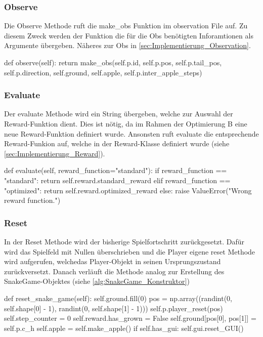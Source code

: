 \subsubsection{Observe} \label{sec:Implementierung-Observe}
Die Observe Methode ruft die make\_obs Funktion im observation File auf. Zu diesem Zweck werden der Funktion die für die Obs benötigten Inforamtionen als Argumente übergeben. Näheres zur Obs in \ref{sec:Implementierung_Observation}.
\begin{python}
    def observe(self):
			return make_obs(self.p.id, self.p.pos, self.p.tail_pos, self.p.direction, self.ground, self.apple, self.p.inter_apple_steps)
\end{python}

\subsubsection{Evaluate} \label{sec:Implementierung-Evaluate}
Der evaluate Methode wird ein String übergeben, welche zur Auswahl der Reward-Funktion dient. Dies ist nötig, da im Rahmen der Optimierung B eine neue Reward-Funktion definiert wurde. Ansonsten ruft evaluate die entsprechende Reward-Funkion auf, welche in der Reward-Klasse definiert wurde (siehe \ref{sec:Implementierung_Reward}).
\begin{python}
	def evaluate(self, reward_function="standard"):
		if reward_function == "standard":
			return self.reward.standard_reward
		elif reward_function == "optimized":
			return self.reward.optimized_reward
		else:
			raise ValueError("Wrong reward function.")
\end{python}

\subsubsection{Reset} \label{sec:Implementierung-Reset}
In der Reset Methode wird der bisherige Spielfortschritt zurückgesetzt. Dafür wird das Spielfeld mit Nullen überschrieben und die Player eigene reset Methode wird aufgerufen, welchedas Player-Objekt in seinen Ursprungszustand zurückversetzt. Danach verläuft die Methode analog zur Erstellung des SnakeGame-Objektes (siehe \ref{alg:SnakeGame_Konstruktor})
\begin{python}
	def reset_snake_game(self):
		self.ground.fill(0)
		pos = np.array((randint(0, self.shape[0] - 1), randint(0, self.shape[1] - 1)))
		self.p.player_reset(pos)
		self.step_counter = 0
		self.reward.has_grown = False
		self.ground[pos[0], pos[1]] = self.p.c_h
		self.apple = self.make_apple()
		if self.has_gui:
			self.gui.reset_GUI()
\end{python}

